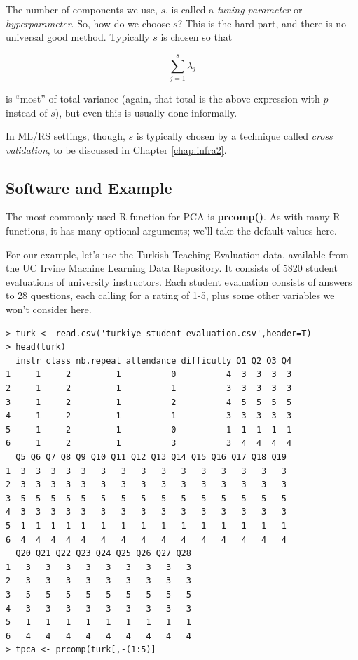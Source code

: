 The number of components we use, $s$, is called a \textit{tuning
parameter} or \textit{hyperparameter}.  So, how do we choose $s$?  This
is the hard part, and there is no universal good method.  Typically $s$
is chosen so that 

\begin{equation} 
\sum_{j=1}^s \lambda_j
\end{equation}

is ``most'' of total variance (again, that total is the above expression
with $p$ instead of $s$), but even this is usually done informally.

In ML/RS settings, though, $s$ is typically chosen by a technique called
\textit{cross validation}, to be discussed in Chapter \ref{chap:infra2}.

\subsection{Software and Example}

The most commonly used R function for PCA is \textbf{prcomp()}.  As with
many R functions, it has many optional arguments; we'll take the default
values here.

For our example, let's use the Turkish Teaching Evaluation data,
available from the UC Irvine Machine Learning Data Repository.  It
consists of 5820 student evaluations of university instructors.  Each
student evaluation consists of answers to 28 questions, each calling for
a rating of 1-5, plus some other variables we won't consider here.

\begin{lstlisting}
> turk <- read.csv('turkiye-student-evaluation.csv',header=T)
> head(turk)
  instr class nb.repeat attendance difficulty Q1 Q2 Q3 Q4
1     1     2         1          0          4  3  3  3  3
2     1     2         1          1          3  3  3  3  3
3     1     2         1          2          4  5  5  5  5
4     1     2         1          1          3  3  3  3  3
5     1     2         1          0          1  1  1  1  1
6     1     2         1          3          3  4  4  4  4
  Q5 Q6 Q7 Q8 Q9 Q10 Q11 Q12 Q13 Q14 Q15 Q16 Q17 Q18 Q19
1  3  3  3  3  3   3   3   3   3   3   3   3   3   3   3
2  3  3  3  3  3   3   3   3   3   3   3   3   3   3   3
3  5  5  5  5  5   5   5   5   5   5   5   5   5   5   5
4  3  3  3  3  3   3   3   3   3   3   3   3   3   3   3
5  1  1  1  1  1   1   1   1   1   1   1   1   1   1   1
6  4  4  4  4  4   4   4   4   4   4   4   4   4   4   4
  Q20 Q21 Q22 Q23 Q24 Q25 Q26 Q27 Q28
1   3   3   3   3   3   3   3   3   3
2   3   3   3   3   3   3   3   3   3
3   5   5   5   5   5   5   5   5   5
4   3   3   3   3   3   3   3   3   3
5   1   1   1   1   1   1   1   1   1
6   4   4   4   4   4   4   4   4   4
> tpca <- prcomp(turk[,-(1:5)]
\end{lstlisting}

